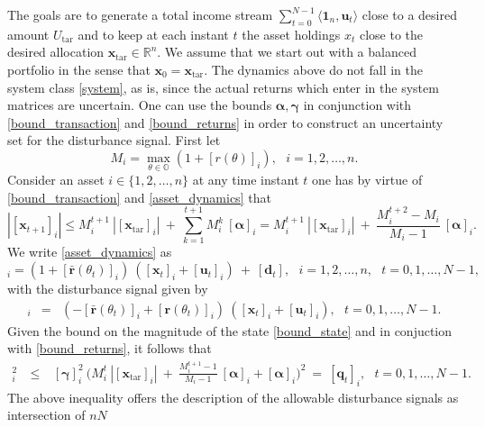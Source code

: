 \documentclass[letterpaper,11pt]{article}
\begin{document}
The goals are to generate a total income stream  $ \sum_{t=0}^{N-1} \langle \mathbf{1}_n, \mathbf{u}_t \rangle$ 
close to a desired amount $U_{\text{tar}}$ and
to keep at each instant $t$ the asset holdings $x_t$ close to  the desired allocation $ \mathbf{x}_{\text{tar}} \in \mathbb{R}^n$.
We assume that we start out with a balanced portfolio in the sense that $ \mathbf{x}_0 = \mathbf{x}_{\text{tar}}$. 
The dynamics above do not fall  in the system class \eqref{system}, as is, since the actual returns which enter in  the system matrices are uncertain. 
One can use the bounds $  \bm{\alpha},  \bm{\gamma}$
in conjunction with  \eqref{bound_transaction} and \eqref{bound_returns}
in order to construct an uncertainty set for the disturbance signal.
First let 
$$
M_i  =   \max_{\theta \in \mathbb{O}} (1 + [r(\theta)]_i), ~~~ i = 1, 2, \hdots, n.
$$
Consider an asset $i \in \{1, 2, \hdots, n \}$ at any time instant $t$ one has by virtue of
\eqref{bound_transaction} and \eqref{asset_dynamics}  that
\begin{equation}
\label{bound_state}
| [ \mathbf{x}_{t+1}]_i | \leq M_i^{t+1} ~  | [ \mathbf{x}_{\text{tar}}]_i | ~+  ~ \sum_{k=1}^{t+1}
M_i^k ~ [\bm{\alpha}]_i = M_i^{t+1} ~  | [ \mathbf{x}_{\text{tar}}]_i |  ~+  ~  
\frac{M_i^{t+2}-M_i}{M_i-1}~ [\bm{\alpha}]_i.
\end{equation}
We write \eqref{asset_dynamics} as
\begin{equation*}
[ \mathbf{x}_{t+1}]_i = ( 1 +  [\bar{ \mathbf{r}}(\theta_t)]_i ) ~  ( [\mathbf{x}_{t}]_i  + [\mathbf{u}_t ]_i ) ~+~ [\mathbf{d}_{t}],  ~~~ i = 1, 2, \hdots, n, ~~~ t= 0,1,  \hdots, N-1,
\end{equation*}
with the disturbance signal given by
\begin{eqnarray*}
	[ \mathbf{d}_t ]_i    &  =  & ( -[ \bar{\mathbf{r}}(\theta_t)]_i +
	[ \mathbf{r}(\theta_t)]_i ) ~  ( [\mathbf{x}_{t}]_i  + [\mathbf{u}_t ]_i ),~~~ t= 0,1,  \hdots, N-1.
\end{eqnarray*}
Given the bound on the magnitude of the state \eqref{bound_state} and in conjuction with \eqref{bound_returns}, it follows that
\begin{eqnarray*}
	[\mathbf{d}_{t}]_i^2 &~\leq~& [\bm{\gamma}]_i^2 ~ \bigg( M_i^{t} ~   | [ \mathbf{x}_{\text{tar}}]_i | ~+~  \frac{M_i^{t+1}-1}{M_i-1}  ~  [\bm{\alpha}]_i +   [\bm{\alpha}]_i  \bigg)^2
	~=~ [\mathbf{q}_{t}]_i, ~~~ t= 0,1,  \hdots, N-1.
\end{eqnarray*}
The above inequality offers the description of the allowable disturbance signals as intersection of $n  N$ 
\end{document}
